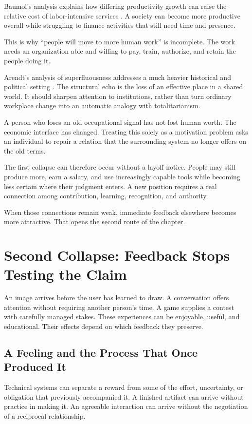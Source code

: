 \documentclass[11pt,openany]{book}
\begin{document}
Baumol's analysis explains how differing productivity growth can raise the relative cost of labor-intensive services \cite{baumol1967macro}. A society can become more productive overall while struggling to finance activities that still need time and presence.

This is why “people will move to more human work” is incomplete. The work needs an organization able and willing to pay, train, authorize, and retain the people doing it.

Arendt's analysis of superfluousness addresses a much heavier historical and political setting \cite{arendt1951origins}. The structural echo is the loss of an effective place in a shared world. It should sharpen attention to institutions, rather than turn ordinary workplace change into an automatic analogy with totalitarianism.

A person who loses an old occupational signal has not lost human worth. The economic interface has changed. Treating this solely as a motivation problem asks an individual to repair a relation that the surrounding system no longer offers on the old terms.

The first collapse can therefore occur without a layoff notice. People may still produce more, earn a salary, and use increasingly capable tools while becoming less certain where their judgment enters. A new position requires a real connection among contribution, learning, recognition, and authority.

When those connections remain weak, immediate feedback elsewhere becomes more attractive. That opens the second route of the chapter.

\section{Second Collapse: Feedback Stops Testing the Claim}

An image arrives before the user has learned to draw. A conversation offers attention without requiring another person's time. A game supplies a contest with carefully managed stakes. These experiences can be enjoyable, useful, and educational. Their effects depend on which feedback they preserve.

\subsection{A Feeling and the Process That Once Produced It}

Technical systems can separate a reward from some of the effort, uncertainty, or obligation that previously accompanied it. A finished artifact can arrive without practice in making it. An agreeable interaction can arrive without the negotiation of a reciprocal relationship.
\end{document}
